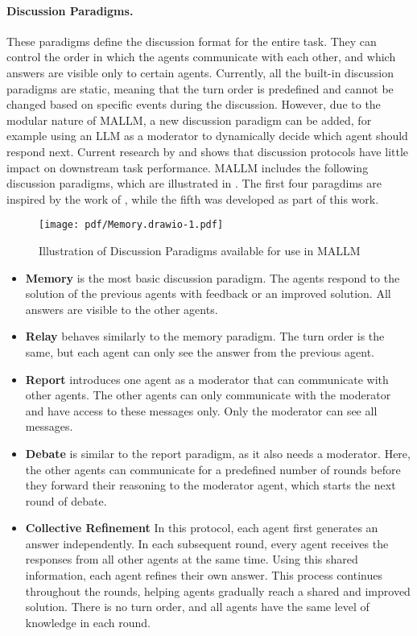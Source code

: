 \paragraph{Discussion Paradigms.}
These paradigms define the discussion format for the entire task. They can control the order in which the agents communicate with each other, and which answers are visible only to certain agents. Currently, all the built-in discussion paradigms are static, meaning that the turn order is predefined and cannot be changed based on specific events during the discussion. However, due to the modular nature of \ac{MALLM}, a new discussion paradigm can be added, for example using an \ac{LLM} as a moderator to dynamically decide which agent should respond next. Current research by \citet{yin_exchange--thought_2023} and \citet{becker_multi-agent_2024} shows that discussion protocols have little impact on downstream task performance. \ac{MALLM} includes the following discussion paradigms, which are illustrated in . The first four paragdims are inspired by the work of \citet{yin_exchange--thought_2023}, while the fifth was developed as part of this work.
\begin{figure}[H]
    \centering
    \texttt{[image: pdf/Memory.drawio-1.pdf]}
    \caption{Illustration of Discussion Paradigms available for use in \ac{MALLM}}
    \label{fig:discussion_paradigms}
\end{figure}

\begin{itemize}
    \item \textbf{Memory} is the most basic discussion paradigm. The agents respond to the solution of the previous agents with feedback or an improved solution. All answers are visible to the other agents. 
    \item \textbf{Relay} behaves similarly to the memory paradigm. The turn order is the same, but each agent can only see the answer from the previous agent.
    \item \textbf{Report} introduces one agent as a moderator that can communicate with other agents. The other agents can only communicate with the moderator and have access to these messages only. Only the moderator can see all messages.
    \item \textbf{Debate} is similar to the report paradigm, as it also needs a moderator. Here, the other agents can communicate for a predefined number of rounds before they forward their reasoning to the moderator agent, which starts the next round of debate.
    \item \textbf{Collective Refinement} In this protocol, each agent first generates an answer independently. In each subsequent round, every agent receives the responses from all other agents at the same time. Using this shared information, each agent refines their own answer. This process continues throughout the rounds, helping agents gradually reach a shared and improved solution. There is no turn order, and all agents have the same level of knowledge in each round.
\end{itemize}

